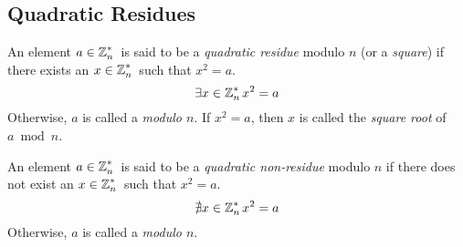 \subsection{Quadratic Residues}\label{subsec:Quadratic_Residues}
\begin{definition}\label{def:Quadratic_Residue}
  An element $a \in \operatorname{\mathbb{Z}}_{n}^{*}{}$ is said to be a \emph{quadratic residue} modulo $n$ (or a \emph{square}) if there exists an $x \in \operatorname{\mathbb{Z}}_{n}^{*}{}$ such that $x^{2} = a$.
  \begin{equation}\label{eq:Quadratic_Residue}
    \exists x \in \operatorname{\mathbb{Z}}_{n}^{*}{} x^{2} = a
  \end{equation}
  Otherwise, $a$ is called a \emph{ modulo $n$}.
  If $x^{2} = a$, then $x$ is called the \emph{square root} of $a \bmod n$.
\end{definition}

\begin{definition}\label{def:Quadratic_Non_Residue}
  An element $a \in \operatorname{\mathbb{Z}}_{n}^{*}{}$ is said to be a \emph{quadratic non-residue} modulo $n$ if there does not exist an $x \in \operatorname{\mathbb{Z}}_{n}^{*}{}$ such that $x^{2} = a$.
  \begin{equation*}
    \nexists x \in \operatorname{\mathbb{Z}}_{n}^{*}{} x^{2} = a
  \end{equation*}
  Otherwise, $a$ is called a \emph{ modulo $n$}.
\end{definition}
